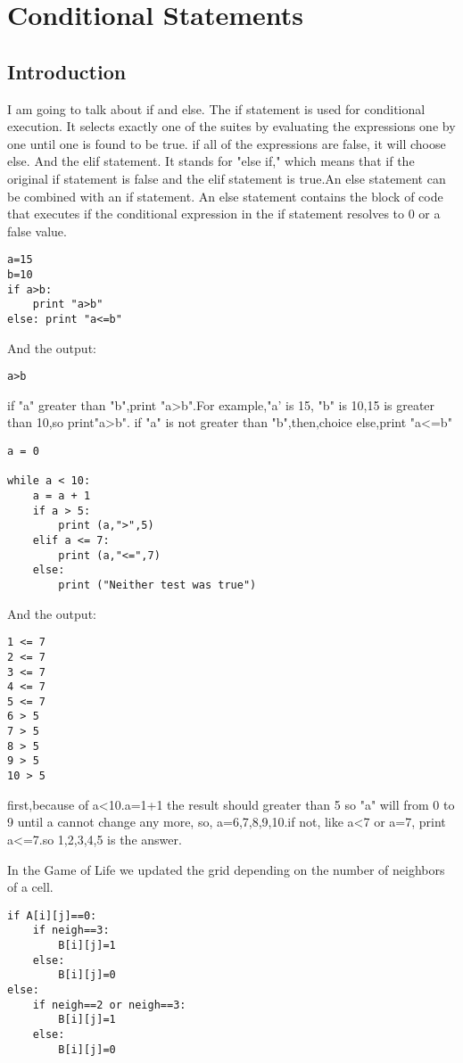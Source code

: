 \chapter{Conditional Statements}



\section{Introduction}
I am going to talk about if and else.
The if statement is used for conditional execution.
It selects exactly one of the suites by evaluating the 
expressions one by one until one is found to be true.
if all of the expressions are false, it will choose else.
And the elif statement. It stands for "else if," which means 
that if the original if statement is false and the elif 
statement is true.An else statement can be combined with an 
if statement. An else statement contains the block of code 
that executes if the conditional expression in the if 
statement resolves to 0 or a false value. 
\begin{verbatim}
a=15
b=10
if a>b:
    print "a>b"
else: print "a<=b"
\end{verbatim}
And the output:
\begin{verbatim}
a>b
\end{verbatim}
if "a" greater than "b",print "a>b".For example,"a' is 15,
"b" is 10,15 is greater than 10,so print"a>b". if "a" is not 
greater than "b",then,choice else,print "a<=b"

\begin{verbatim}
a = 0

while a < 10:
    a = a + 1
    if a > 5:
        print (a,">",5)
    elif a <= 7:
        print (a,"<=",7)
    else:
        print ("Neither test was true")
\end{verbatim}
And the output:
\begin{verbatim}
1 <= 7
2 <= 7
3 <= 7
4 <= 7
5 <= 7
6 > 5
7 > 5
8 > 5
9 > 5
10 > 5 
\end{verbatim}
first,because of a<10.a=1+1 the result should greater than 5
so "a" will from 0 to 9 until a cannot change any more,
so, a=6,7,8,9,10.if not, like a<7 or a=7, print a<=7.so 
1,2,3,4,5 is the answer.
 
  
  
In the Game of Life we updated the grid depending on the number of neighbors of a cell.
\begin{verbatim}
if A[i][j]==0:
    if neigh==3:
        B[i][j]=1
    else:
        B[i][j]=0
else:
    if neigh==2 or neigh==3:
        B[i][j]=1
    else:
        B[i][j]=0
\end{verbatim}
